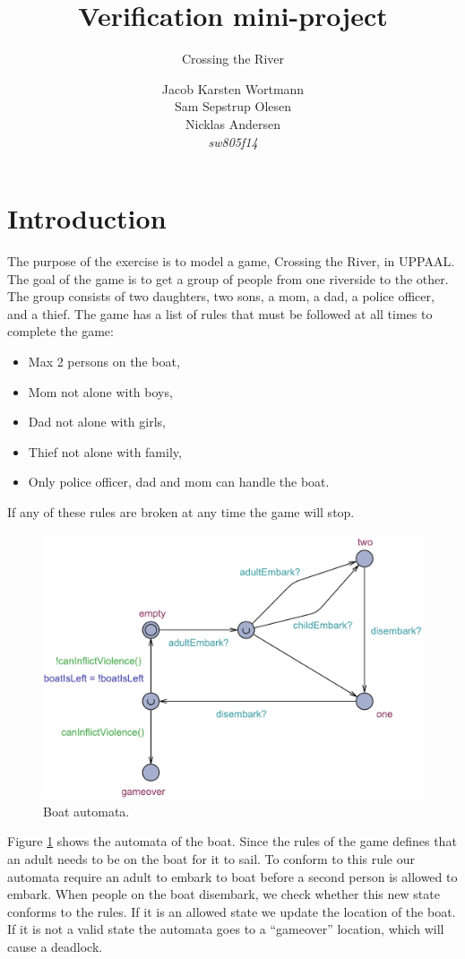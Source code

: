 \documentclass[a4paper,12pt]{scrartcl}
\title{Verification mini-project}
\subtitle{Crossing the River}
\author{Jacob Karsten Wortmann\\Sam Sepstrup Olesen\\Nicklas Andersen\\\textit{sw805f14}}
\begin{document}
\maketitle %

\section{Introduction}
The purpose of the exercise is to model a game, Crossing the River, in UPPAAL. The goal of the game is to get a group of people from one riverside to the other. The group consists of two daughters, two sons, a mom, a dad, a police officer, and a thief.
The game has a list of rules that must be followed at all times to complete the game:

\begin{itemize}
\item Max 2 persons on the boat,
\item Mom not alone with boys,
\item Dad not alone with girls,
\item Thief not alone with family,
\item Only police officer, dad and mom can handle the boat.
\end{itemize}

If any of these rules are broken at any time the game will stop.

\begin{figure}[h]
\centering
\includegraphics[width=\linewidth]{Boat.pdf}
\caption{Boat automata.}
\label{fig:boat}
\end{figure}

Figure \ref{fig:boat} shows the automata of the boat. Since the rules of the game defines that an adult needs to be on the boat for it to sail. To conform to this rule our automata require an adult to embark to boat before a second person is allowed to embark. When people on the boat disembark, we check whether this new state conforms to the rules. If it is an allowed state we update the location of the boat. If it is not a valid state the automata goes to a ``gameover'' location, which will cause a deadlock.
\end{document}
